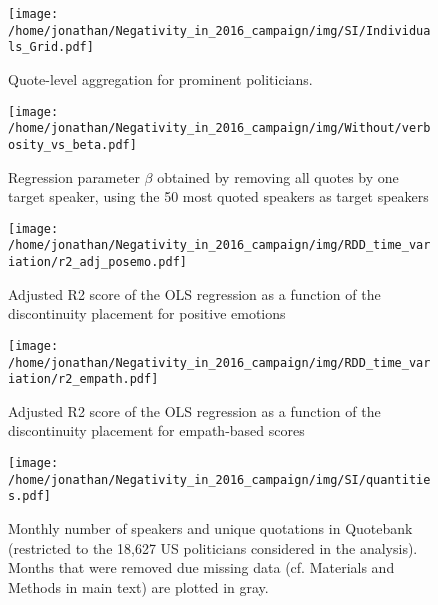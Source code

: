 \begin{figure}[h]\centering
	\texttt{[image: /home/jonathan/Negativity\_in\_2016\_campaign/img/SI/Individuals\_Grid.pdf]}
	\caption{Quote-level aggregation for prominent politicians.}
	\label{fig: SI_8}
\end{figure}



\begin{figure}[h]\centering
	\texttt{[image: /home/jonathan/Negativity\_in\_2016\_campaign/img/Without/verbosity\_vs\_beta.pdf]}
	\caption{Regression parameter $\beta$ obtained by removing all quotes by one target speaker, using the 50 most quoted speakers as target speakers}
	\label{fig: SI_9}
\end{figure}



\begin{figure}[h]\centering
	\texttt{[image: /home/jonathan/Negativity\_in\_2016\_campaign/img/RDD\_time\_variation/r2\_adj\_posemo.pdf]}
	\caption{Adjusted R2 score of the OLS regression as a function of the discontinuity placement for positive emotions}
	\label{fig: SI_10}
\end{figure}



\begin{figure}[h]\centering
	\texttt{[image: /home/jonathan/Negativity\_in\_2016\_campaign/img/RDD\_time\_variation/r2\_empath.pdf]}
	\caption{Adjusted R2 score of the OLS regression as a function of the discontinuity placement for empath-based scores}
	\label{fig: SI_11}
\end{figure}



\begin{figure}[h]\centering
	\texttt{[image: /home/jonathan/Negativity\_in\_2016\_campaign/img/SI/quantities.pdf]}
	\caption{Monthly number of speakers and unique quotations in Quotebank (restricted to the 18,627 US politicians considered in the analysis). Months that were removed due missing data (cf. Materials and Methods in main text) are plotted in gray.}
	\label{fig: SI_12}
\end{figure}



\clearpage
\pagebreak
